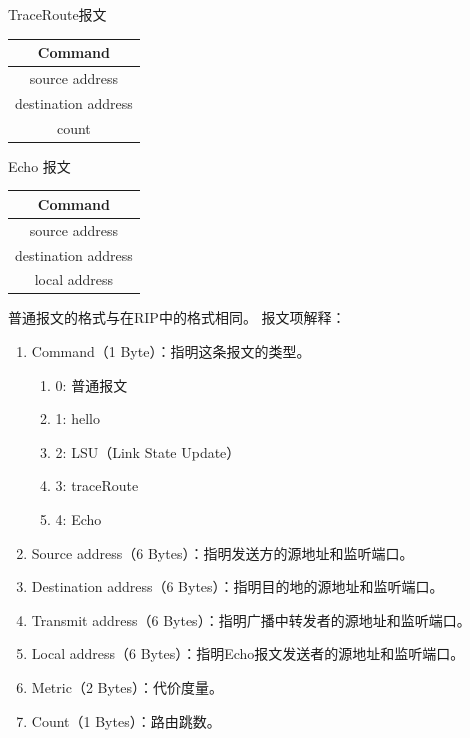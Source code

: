 TraceRoute报文
\begin{table}[H]
	\centering
	\begin{tabular}{|c|}
		\hline              
		Command             \\
		\hline              
		source address      \\
		\hline              
		destination address \\
		\hline              
		count               \\
		\hline              
	\end{tabular}		
\end{table}	

Echo 报文
\begin{table}[H]
	\centering
	\begin{tabular}{|c|}
		\hline              
		Command             \\
		\hline              
		source address      \\
		\hline              
		destination address \\
		\hline              
		local address       \\
		\hline              
	\end{tabular}		
\end{table}
普通报文的格式与在RIP中的格式相同。
报文项解释：
\begin{enumerate}[(1)]
	\item Command（1 Byte）：指明这条报文的类型。
	      \begin{enumerate}[]
	      	\item 0: 普通报文
	      	\item 1: hello
	      	\item 2: LSU（Link State Update）
	      	\item 3: traceRoute
	      	\item 4: Echo
	      \end{enumerate}
	\item Source address（6 Bytes）：指明发送方的源地址和监听端口。
	\item Destination address（6 Bytes）：指明目的地的源地址和监听端口。
	\item Transmit address（6 Bytes）：指明广播中转发者的源地址和监听端口。
	\item Local address（6 Bytes）：指明Echo报文发送者的源地址和监听端口。
	\item Metric（2 Bytes）：代价度量。
	\item Count（1 Bytes）：路由跳数。
	\end{enumerate}
	
